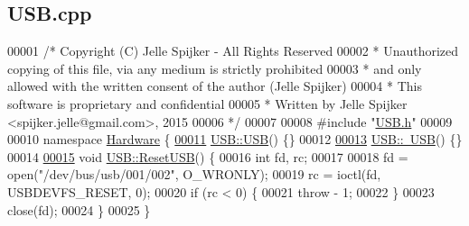 \hypertarget{_u_s_b_8cpp_source}{}\subsection{U\+S\+B.\+cpp}
\label{_u_s_b_8cpp_source}

\begin{DoxyCode}
00001 \textcolor{comment}{/* Copyright (C) Jelle Spijker - All Rights Reserved}
00002 \textcolor{comment}{ * Unauthorized copying of this file, via any medium is strictly prohibited}
00003 \textcolor{comment}{ * and only allowed with the written consent of the author (Jelle Spijker)}
00004 \textcolor{comment}{ * This software is proprietary and confidential}
00005 \textcolor{comment}{ * Written by Jelle Spijker <spijker.jelle@gmail.com>, 2015}
00006 \textcolor{comment}{ */}
00007 
00008 \textcolor{preprocessor}{#include "\hyperlink{_u_s_b_8h}{USB.h}"}
00009 
00010 \textcolor{keyword}{namespace }\hyperlink{namespace_hardware}{Hardware} \{
\hypertarget{_u_s_b_8cpp_source_l00011}{}\hyperlink{class_hardware_1_1_u_s_b_a225d2d24d36cc7c4e46f5c4d19f51fb8}{00011} \hyperlink{class_hardware_1_1_u_s_b_a225d2d24d36cc7c4e46f5c4d19f51fb8}{USB::USB}() \{\}
00012 
\hypertarget{_u_s_b_8cpp_source_l00013}{}\hyperlink{class_hardware_1_1_u_s_b_a808f13d66ce9bdf66a043fd02b4b8cf2}{00013} \hyperlink{class_hardware_1_1_u_s_b_a808f13d66ce9bdf66a043fd02b4b8cf2}{USB::~USB}() \{\}
00014 
\hypertarget{_u_s_b_8cpp_source_l00015}{}\hyperlink{class_hardware_1_1_u_s_b_af387867ec84f4c709b55e3605f9e313e}{00015} \textcolor{keywordtype}{void} \hyperlink{class_hardware_1_1_u_s_b_af387867ec84f4c709b55e3605f9e313e}{USB::ResetUSB}() \{
00016   \textcolor{keywordtype}{int} fd, rc;
00017 
00018   fd = open(\textcolor{stringliteral}{"/dev/bus/usb/001/002"}, O\_WRONLY);
00019   rc = ioctl(fd, USBDEVFS\_RESET, 0);
00020   \textcolor{keywordflow}{if} (rc < 0) \{
00021     \textcolor{keywordflow}{throw} - 1;
00022   \}
00023   close(fd);
00024 \}
00025 \}
\end{DoxyCode}
